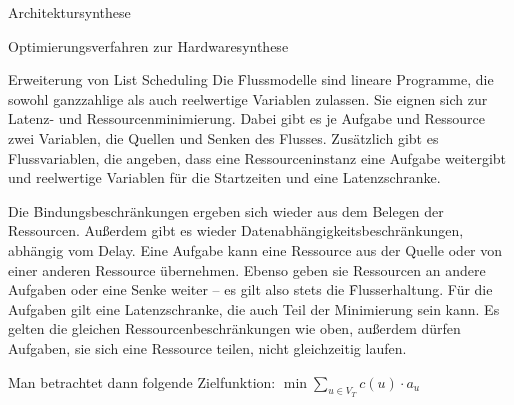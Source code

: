 \begin{chapter}{Architektursynthese}
\begin{section}{Optimierungsverfahren zur Hardwaresynthese}
\begin{subsection}{Erweiterung von List Scheduling}
  Die \f{Flussmodelle} sind lineare Programme, die sowohl ganzzahlige als auch reelwertige Variablen zulassen. Sie eignen sich zur Latenz- und Ressourcenminimierung. Dabei gibt es je Aufgabe und Ressource zwei Variablen, die Quellen und Senken des Flusses. Zusätzlich gibt es Flussvariablen, die angeben, dass eine Ressourceninstanz eine Aufgabe weitergibt und reelwertige Variablen für die Startzeiten und eine Latenzschranke.
  
  Die \f{Bindungsbeschränkungen} ergeben sich wieder aus dem Belegen der Ressourcen. Außerdem gibt es wieder Datenabhängigkeitsbeschränkungen, abhängig vom Delay. Eine Aufgabe kann eine Ressource aus der Quelle oder von einer anderen Ressource übernehmen. Ebenso geben sie Ressourcen an andere Aufgaben oder eine Senke weiter -- es gilt also stets die \f{Flusserhaltung}. Für die Aufgaben gilt eine Latenzschranke, die auch Teil der Minimierung sein kann. Es gelten die gleichen Ressourcenbeschränkungen wie oben, außerdem dürfen Aufgaben, sie sich eine Ressource teilen, nicht gleichzeitig laufen. 
  
  Man betrachtet dann folgende Zielfunktion: $\min \sum_{u\in V_T} c(u)\cdot a_u$
 \end{subsection}
\end{section}
\end{chapter}
